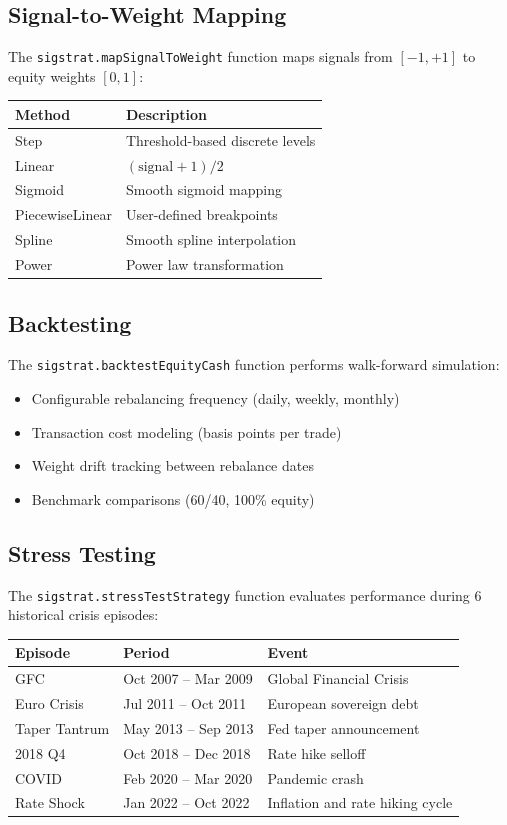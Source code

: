 \documentclass[11pt,a4paper]{article}
\begin{document}
\subsection{Signal-to-Weight Mapping}
The \texttt{sigstrat.mapSignalToWeight} function maps signals from $[-1,+1]$ to equity weights $[0,1]$:
\begin{center}
\begin{tabularx}{\textwidth}{l X}
\toprule
\textbf{Method} & \textbf{Description} \\
\midrule
Step & Threshold-based discrete levels \\
Linear & $(\text{signal} + 1) / 2$ \\
Sigmoid & Smooth sigmoid mapping \\
PiecewiseLinear & User-defined breakpoints \\
Spline & Smooth spline interpolation \\
Power & Power law transformation \\
\bottomrule
\end{tabularx}
\end{center}

\subsection{Backtesting}
The \texttt{sigstrat.backtestEquityCash} function performs walk-forward simulation:
\begin{itemize}[leftmargin=2em]
  \item Configurable rebalancing frequency (daily, weekly, monthly)
  \item Transaction cost modeling (basis points per trade)
  \item Weight drift tracking between rebalance dates
  \item Benchmark comparisons (60/40, 100\% equity)
\end{itemize}

\subsection{Stress Testing}
The \texttt{sigstrat.stressTestStrategy} function evaluates performance during 6 historical crisis episodes:
\begin{center}
\begin{tabularx}{\textwidth}{l l X}
\toprule
\textbf{Episode} & \textbf{Period} & \textbf{Event} \\
\midrule
GFC & Oct 2007 -- Mar 2009 & Global Financial Crisis \\
Euro Crisis & Jul 2011 -- Oct 2011 & European sovereign debt \\
Taper Tantrum & May 2013 -- Sep 2013 & Fed taper announcement \\
2018 Q4 & Oct 2018 -- Dec 2018 & Rate hike selloff \\
COVID & Feb 2020 -- Mar 2020 & Pandemic crash \\
Rate Shock & Jan 2022 -- Oct 2022 & Inflation and rate hiking cycle \\
\bottomrule
\end{tabularx}
\end{center}
\newpage
\end{document}
